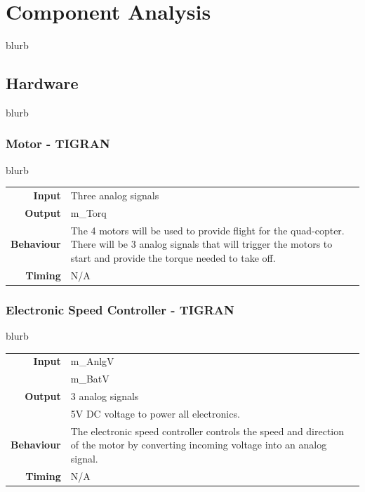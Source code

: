 \documentclass[10pt,letterpaper]{article}
\begin{document}
\section{Component Analysis}
blurb

\subsection{Hardware}
blurb

\subsubsection{Motor - TIGRAN}
blurb
\begin{center}
  \begin{tabular}{r p{8.5cm}}
      \textbf{Input} & Three analog signals \\
      \textbf{Output} & m\_Torq \\
      \textbf{Behaviour} & The 4 motors will be used to provide flight for the quad-copter. There will be 3 analog signals that will trigger the motors to start and provide the torque needed to take off.\\
      \textbf{Timing} & N/A\\
  \end{tabular}
\end{center}

\subsubsection{Electronic Speed Controller - TIGRAN}
blurb
\begin{center}
  \begin{tabular}{r p{8.5cm}}
      \textbf{Input} & m\_AnlgV\\ & m\_BatV \\
      \textbf{Output} & 3 analog signals\\ & 5V DC voltage to power all electronics.\\
      \textbf{Behaviour} & The electronic speed controller controls the speed and direction of the motor by converting incoming voltage  into an analog signal.\\
      \textbf{Timing} & N/A\\
  \end{tabular}
\end{center}
\end{document}
